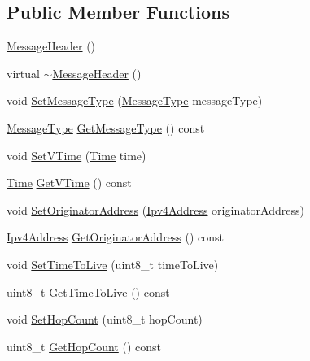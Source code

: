 \subsection*{Public Member Functions}
\begin{DoxyCompactItemize}
\item 
\hyperlink{classns3_1_1olsr_1_1MessageHeader_aa3b315885734c10ed561a7c5f7547986}{Message\+Header} ()
\item 
virtual \hyperlink{classns3_1_1olsr_1_1MessageHeader_aadf67e5024d9d87deff3b09f8b0b7b98}{$\sim$\+Message\+Header} ()
\item 
void \hyperlink{classns3_1_1olsr_1_1MessageHeader_a9d133e286551d71fce97c683bbeab06a}{Set\+Message\+Type} (\hyperlink{classns3_1_1olsr_1_1MessageHeader_aff5a31b07c415097a5ada41d53e9a99e}{Message\+Type} message\+Type)
\item 
\hyperlink{classns3_1_1olsr_1_1MessageHeader_aff5a31b07c415097a5ada41d53e9a99e}{Message\+Type} \hyperlink{classns3_1_1olsr_1_1MessageHeader_af8c5ea03e22de1daaa3a9387f2e4c6bc}{Get\+Message\+Type} () const 
\item 
void \hyperlink{classns3_1_1olsr_1_1MessageHeader_adc787906a9c4869651486bb0e3225afd}{Set\+V\+Time} (\hyperlink{classns3_1_1Time}{Time} time)
\item 
\hyperlink{classns3_1_1Time}{Time} \hyperlink{classns3_1_1olsr_1_1MessageHeader_a8fd4d4a40d2ca38b7029b90877afd8c2}{Get\+V\+Time} () const 
\item 
void \hyperlink{classns3_1_1olsr_1_1MessageHeader_a11e1894ac034f9571ba25a331449c88b}{Set\+Originator\+Address} (\hyperlink{classns3_1_1Ipv4Address}{Ipv4\+Address} originator\+Address)
\item 
\hyperlink{classns3_1_1Ipv4Address}{Ipv4\+Address} \hyperlink{classns3_1_1olsr_1_1MessageHeader_a5d51b2366837c88813d615c02a9093be}{Get\+Originator\+Address} () const 
\item 
void \hyperlink{classns3_1_1olsr_1_1MessageHeader_ad3d378b9f0d2f6f2aaa7f506d435b128}{Set\+Time\+To\+Live} (uint8\+\_\+t time\+To\+Live)
\item 
uint8\+\_\+t \hyperlink{classns3_1_1olsr_1_1MessageHeader_a44081946d19ba6a67f0c259bdee41522}{Get\+Time\+To\+Live} () const 
\item 
void \hyperlink{classns3_1_1olsr_1_1MessageHeader_a1af1283fd682d7d821b6f0f5545aa628}{Set\+Hop\+Count} (uint8\+\_\+t hop\+Count)
\item 
uint8\+\_\+t \hyperlink{classns3_1_1olsr_1_1MessageHeader_a9f16c98696939e4396701937f86341a6}{Get\+Hop\+Count} () const 

\end{DoxyCompactItemize}
